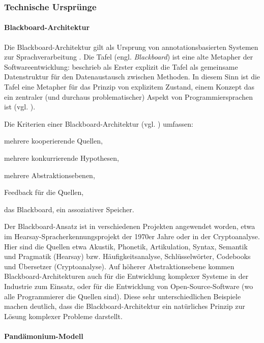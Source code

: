 \documentclass[abstracton, 12pt]{scrartcl}
\begin{document}
\subsubsection{Technische Ursprünge} \label{anno-grundlagen-technisch}

\paragraph{Blackboard-Architektur} \label{anno-blackboard}

Die Blackboard-Architektur gilt als Ursprung von anno\-tations\-ba\-siert\-en Systemen zur Sprachverarbeitung \citep{CunninghamAndBontcheva2006}. Die Tafel (engl. \emph{Blackboard}) ist eine alte Metapher der Softwareentwicklung: \citet{Newell1962} beschrieb als Erster explizit die Tafel als gemeinsame Datenstruktur für den Datenaustausch zwischen Methoden. In diesem Sinn ist die Tafel eine Metapher für das Prinzip von explizitem Zustand, einem Konzept das ein zentraler (und durchaus problematischer) Aspekt von Programmiersprachen ist (vgl. \citealt[405,569]{VanRoyAndHaridi2004}).

Die Kriterien einer Blackboard-Architektur (vgl. \citealt{Corkill2003}) umfassen: \begin{inparaenum}
\item mehrere kooperierende Quellen,
\item mehrere konkurrierende Hypothesen,
\item mehrere Abstraktionsebenen,
\item Feedback für die Quellen,
\item das Blackboard, ein assoziativer Speicher.
\end{inparaenum} Der Blackboard-Ansatz ist in verschiedenen Projekten angewendet worden, etwa im Hearsay-Spracherkennungsprojekt der 1970er Jahre \citep{ErmanEtAl1980} oder in der Cryptoanalyse. Hier sind die Quellen etwa Akustik, Phonetik, Artikulation, Syntax, Semantik und Pragmatik (Hearsay) bzw. Häufigkeitsanalyse, Schlüsselwörter, Codebooks und Übersetzer (Cryptoanalyse). Auf höherer Abstraktionsebene kommen Blackboard-Architekturen auch für die Entwicklung komplexer Systeme in der Industrie zum Einsatz, oder für die Entwicklung von Open-Source-Software (wo alle Programmierer die Quellen sind). Diese sehr unterschiedlichen Beispiele machen deutlich, dass die Blackboard-Architektur ein natürliches Prinzip zur Lösung komplexer Probleme darstellt.

\paragraph{Pandämonium-Modell}
\end{document}
